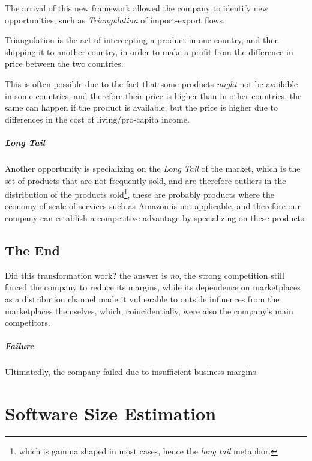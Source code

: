 \documentclass[openright, twoside, twocolumn]{report}
\begin{document}
The arrival of this new framework allowed the company to identify new opportunities, such as \emph{Triangulation} of
import-export flows.

\begin{definition}[Triangulation]
  Triangulation is the act of intercepting a product in one country, and then shipping it to another country, in order to
  make a profit from the difference in price between the two countries.

  This is often possible due to the fact that some products \emph{might} not be available in some countries, and therefore
  their price is higher than in other countries, the same can happen if the product is available, but the price is higher due to
  differences in the cost of living/pro-capita income.
\end{definition}

\paragraph{Long Tail}
Another opportunity is specializing on the \emph{Long Tail} of the market, which is the set of products that are not
frequently sold, and are therefore outliers in the distribution of the products sold\footnote{
  which is gamma shaped in most cases, hence the \emph{long tail} metaphor.
}, these are probably products where the economy of scale of services such as Amazon is not applicable, and therefore
our company can establish a competitive advantage by specializing on these products.

\section{The End}

Did this transformation work? the answer is \emph{no}, the strong competition still forced the
company to reduce its margins, while its dependence on marketplaces as a distribution channel made it vulnerable to
outside influences from the marketplaces themselves, which, coincidentially, were also the company's main competitors.

\paragraph{Failure}
Ultimatedly, the company failed due to insufficient business margins.

\chapter{Software Size Estimation}
\end{document}
